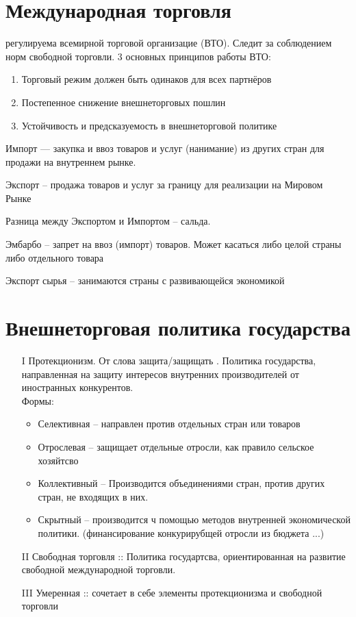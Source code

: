 \documentclass[12pt,a4paper]{book}
\begin{document}
\section{Международная торговля}
регулируема всемирной торговой организацие (ВТО). Следит за соблюдением норм свободной торговли.
3 основных принципов работы ВТО:
\begin{enumerate}
	\item Торговый режим должен быть одинаков для всех партнёров
	\item Постепенное снижение внешнеторговых пошлин 
	\item Устойчивость и предсказуемость в внешнеторговой политике
\end{enumerate}

Импорт --- закупка и ввоз товаров и услуг (нанимание) из других стран для продажи на внутреннем рынке.

Экспорт -- продажа товаров и услуг за границу для реализации на Мировом Рынке

Разница между Экспортом и Импортом -- сальда.

Эмбарбо -- запрет на ввоз (импорт) товаров. Может касаться либо целой страны либо отдельного товара

Экспорт сырья -- занимаются страны с развивающейся экономикой
\section{Внешнеторговая политика государства}
\begin{itemize}
	\item [I] Протекционизм. От слова защита/защищать . Политика государства, направленная на защиту интересов внутренних производителей от иностранных конкурентов.\\
	Формы:
	\begin{itemize}
		\item Селективная -- направлен против отдельных стран или товаров
		\item Отрослевая -- защищает отдельные отросли, как правило сельское хозяйтсво
		\item Коллективный -- Производится объединениями стран, против других стран, не входящих в них.
		\item Скрытный -- производится ч помощью методов внутренней экономической политики. (финансирование конкурирубщей отросли из бюджета ...)
	\end{itemize}
	\item [II] Свободная торговля :: Политика государтсва, ориентированная на развитие свободной международной торговли.
	\item [III] Умеренная :: сочетает в себе элементы протекционизма и свободной торговли
\end{itemize}
\end{document}
